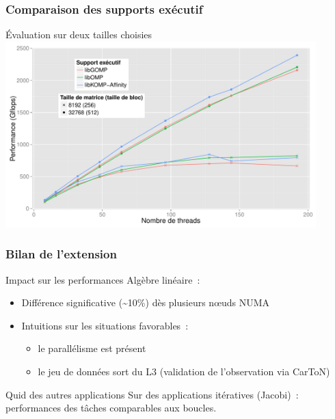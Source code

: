 \documentclass[xcolor={usenames,dvipsnames,svgnames,table}, aspectratio=43]{beamer}
\begin{document}
\begin{frame}
  \frametitle{Comparaison des supports exécutif}
  Évaluation sur deux tailles choisies
  \includegraphics[width=0.9\textwidth]{graph/graph_all_cholesky_idchire.pdf}
\end{frame}

\begin{frame}
  \frametitle{Bilan de l'extension}

  \begin{block}{Impact sur les performances}
    Algèbre linéaire~:
    \begin{itemize}
      \item Différence significative (\textasciitilde 10\%) dès plusieurs nœuds NUMA
      \item Intuitions sur les situations favorables~:
      \begin{itemize}
	\item le parallélisme est présent
	\item le jeu de données sort du L3 (validation de l'observation via CarToN)
      \end{itemize}
    \end{itemize}
  \end{block}

  \begin{block}{Quid des autres applications}
    Sur des applications itératives (Jacobi)~: performances des tâches comparables aux boucles.
  \end{block}
\end{frame}
\end{document}
